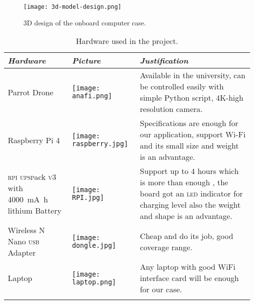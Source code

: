 \documentclass[../main.tex]{subfiles}
\begin{document}
\begin{figure}[h]
	\centering
	\texttt{[image: 3d-model-design.png]}
	\caption{3D design of the onboard computer case.}
	\label{fig:3d-design}
\end{figure}


\begin{table}[p]
	\centering
	\caption{Hardware used in the project.}
	\label{tab:hardware-used}  
	\begin{tabular}{ p{4cm} p{3cm} p{6cm} }
		\toprule
		\textit{Hardware} 
		& \textit{Picture} 
		& \textit{Justification} \\ 
		
		\midrule
		
		Parrot \anafi Drone  
		& \begin{minipage}{.1\textwidth}
			\texttt{[image: anafi.png]}
		\end{minipage} 
		& Available in the university, can be 
		controlled easily 
		with simple Python script, 
		4K-high resolution camera.  \\ 
		\addlinespace
		
		Raspberry Pi 4  
		& \begin{minipage}{.0\textwidth}
			\texttt{[image: raspberry.jpg]}
		\end{minipage} 
		& Specifications are enough for our 
		application, support Wi-Fi and its 
		small size and weight is an advantage.\\ 
		\addlinespace
		
		\textsc{rpi} \textsc{upsp}ack \textsc{v}3 with 
		\SI{4000}{\milli\ampere\hour} 
		lithium Battery  
		& \begin{minipage}{.1\textwidth}
			\texttt{[image: RPI.jpg]}
		\end{minipage}  
		& Support up to 4 hours which is more 
		than enough , the board got an \textsc{led} 
		indicator for charging level also the 
		weight and shape is an advantage.  \\ 
		\addlinespace
		
		Wireless N Nano \textsc{usb} Adapter  
		& \begin{minipage}{.1\textwidth}
			\texttt{[image: dongle.jpg]}
		\end{minipage} 
		& Cheap and do its job, good coverage 
		range.  \\ 
		\addlinespace
		
		Laptop 
		& \begin{minipage}{.1\textwidth}
			\texttt{[image: laptop.png]}
		\end{minipage} 
		& Any laptop with good WiFi interface 
		card will be enough for our case. \\ 
		\addlinespace
		
		\bottomrule
	\end{tabular}
\end{table}
\end{document}
